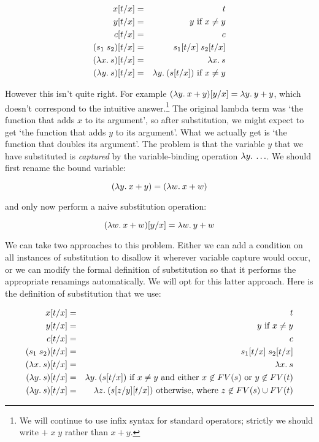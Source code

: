 \begin{eqnarray*}
   x[t/x]            & = & t                           \\
   y[t/x]            & = & y \mbox{ if $x \not= y$}    \\
   c[t/x]            & = & c                           \\
   (s_1\;s_2)[t/x]   & = & s_1[t/x] \; s_2[t/x]        \\
   (\lambda x.\: s)[t/x] & = & \lambda x.\: s                  \\
   (\lambda y.\: s)[t/x] & = & \lambda y.\: (s[t/x]) \mbox{ if $x \not= y$}
\end{eqnarray*}

However this isn't quite right. For example $(\lambda y.\: x + y)[y/x] = \lambda y.\: y
+ y$, which doesn't correspond to the intuitive answer.\footnote{We will
continue to use infix syntax for standard operators; strictly we should write
$+\; x\; y$ rather than $x + y$.} The original lambda term was `the
function that adds $x$ to its argument', so after substitution, we might expect
to get `the function that adds $y$ to its argument'. What we actually get is
`the function that doubles its argument'. The problem is that the variable $y$
that we have substituted is {\em captured} by the variable-binding operation
$\lambda y.\: \ldots$. We should first rename the bound variable:

$$ (\lambda y.\: x + y) = (\lambda w.\: x + w) $$

\noindent and only now perform a naive substitution operation:

$$ (\lambda w.\: x + w)[y/x] = \lambda w.\: y + w $$

We can take two approaches to this problem. Either we can add a condition on
all instances of substitution to disallow it wherever variable capture would
occur, or we can modify the formal definition of substitution so that it
performs the appropriate renamings automatically. We will opt for this latter
approach. Here is the definition of substitution that we use:

\begin{eqnarray*}
   x[t/x]            & = & t                           \\
   y[t/x]            & = & y \mbox{  if $x \not= y$}    \\
   c[t/x]            & = & c                           \\
   (s_1\;s_2)[t/x]   & = & s_1[t/x] \; s_2[t/x]        \\
   (\lambda x.\: s)[t/x] & = & \lambda x.\: s                  \\
   (\lambda y.\: s)[t/x] & = & \lambda y.\: (s[t/x]) \mbox{  if $x \not= y$ and
                                                    either $x \not\in FV(s)$
                                                    or $y \not\in FV(t)$}\\
   (\lambda y.\: s)[t/x] & = & \lambda z.\: (s[z/y][t/x]) \mbox{  otherwise, where
                                               $z \not\in FV(s) \cup FV(t)$}
\end{eqnarray*}

